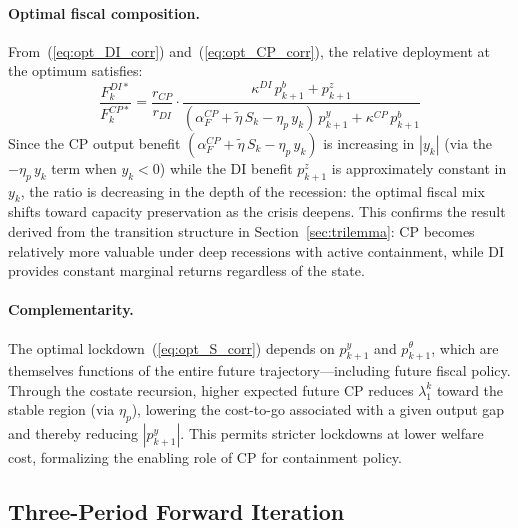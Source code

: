 \documentclass[12pt, a4paper]{article}
\begin{document}
\paragraph{Optimal fiscal composition.}
From~(\ref{eq:opt_DI_corr}) and~(\ref{eq:opt_CP_corr}), the relative
deployment at the optimum satisfies:
%
\begin{equation}
    \frac{F_k^{DI*}}{F_k^{CP*}} =
    \frac{r_{CP}}{r_{DI}} \cdot
    \frac{\kappa^{DI}\, p_{k+1}^b + p_{k+1}^z}
    {(\alpha_F^{CP} + \tilde{\eta}\, S_k - \eta_p\, y_k)\, p_{k+1}^y
    + \kappa^{CP}\, p_{k+1}^b}
    \label{eq:ratio_corr}
\end{equation}
%
Since the CP output benefit
$(\alpha_F^{CP} + \tilde{\eta}\, S_k - \eta_p\, y_k)$ is increasing in
$|y_k|$ (via the $-\eta_p\, y_k$ term when $y_k < 0$) while the DI benefit
$p_{k+1}^z$ is approximately constant in $y_k$, the ratio is decreasing in
the depth of the recession: the optimal fiscal mix shifts toward capacity
preservation as the crisis deepens. This confirms the result derived from the
transition structure in Section~\ref{sec:trilemma}: CP becomes relatively more
valuable under deep recessions with active containment, while DI provides
constant marginal returns regardless of the state.

\paragraph{Complementarity.}
The optimal lockdown~(\ref{eq:opt_S_corr}) depends on $p_{k+1}^y$ and
$p_{k+1}^\theta$, which are themselves functions of the entire future
trajectory---including future fiscal policy. Through the costate recursion,
higher expected future CP reduces $\lambda_1^k$ toward the stable region
(via $\eta_p$), lowering the cost-to-go associated with a given output gap
and thereby reducing $|p_{k+1}^y|$. This permits stricter lockdowns at lower
welfare cost, formalizing the enabling role of CP for containment policy.



\subsection{Three-Period Forward Iteration}
\label{app:iteration}
\end{document}
